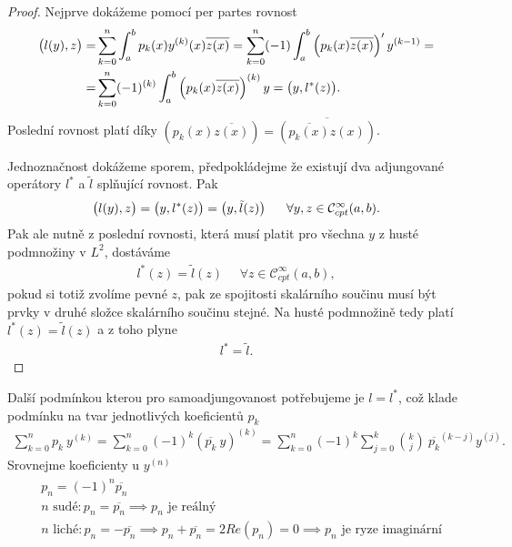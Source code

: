 \begin{proof}
Nejprve dokážeme pomocí per partes rovnost
\begin{align*}
\begin{split}
    \big( l(y), z \big) =& \sum_{k=0}^{n} \int_a^b p_k(x) y^{(k)}(x) \overline{z(x)} =
    \sum_{k=0}^{n} (-1) \int_a^b \left(p_k(x) \overline{z(x)}\right)' y^{(k-1)} = \\
    =& \sum_{k=0}^{n} (-1)^{(k)} \int_a^b \left(p_k(x) \overline{z(x)}\right)^{(k)} y =
    \big( y, l^*(z) \big).
\end{split}
\end{align*}
Poslední rovnost platí díky $\left(p_k(x) \overline{z(x)}\right) = \overline{\left(\overline{p_k(x)} z(x)\right)}$.

Jednoznačnost dokážeme sporem, předpokládejme že existují dva adjungované operátory $l^*$ a $\tilde{l}$ splňující rovnost. Pak
\begin{align*}
    \big( l(y), z \big) = \big( y, l^*(z) \big) = \big( y, \tilde{l}(z) \big) ~ ~ ~ ~ ~ \forall y, z \in \mathcal{C}^{\infty}_{cpt} (a,b).
\end{align*}
Pak ale nutně z poslední rovnosti, která musí platit pro všechna $y$ z husté podmnožiny v $L^2$, dostáváme
\begin{align*}
    l^*(z) = \tilde{l}(z) ~ ~ ~ ~ ~ ~ \forall z \in \mathcal{C}^{\infty}_{cpt} (a,b),
\end{align*}
pokud si totiž zvolíme pevné $z$, pak ze spojitosti skalárního součinu musí být prvky v druhé složce skalárního součinu stejné. Na husté podmnožině tedy platí $l^*(z) = \tilde{l}(z)$ a z toho plyne
\begin{align*}
    l^* = \tilde{l}.
\end{align*}
\end{proof}
Další podmínkou kterou pro samoadjungovanost potřebujeme je $l = l^*$, což klade podmínku na tvar jednotlivých koeficientů $p_k$
\begin{align*}
    \sum_{k=0}^{n} p_k ~ y^{(k)} = \sum_{k=0}^{n} (-1)^{k} \left(\overline{p_k} ~ y\right)^{(k)} = \sum_{k=0}^{n} (-1)^{k} \sum_{j=0}^{k} {k \choose j} ~ \overline{p_k}^{(k-j)} y^{(j)}.
\end{align*}
Srovnejme koeficienty u $y^{(n)}$
\begin{align*}
    \begin{split}
        &p_n = (-1)^{n} \overline{p_n} \\
        &\text{$n$ sudé} : p_n = \overline{p_n} \implies \text{$p_n$ je reálný} \\
        &\text{$n$ liché} : p_n = - \overline{p_n} \implies p_n + \overline{p_n} = 2 Re (p_n) = 0 \implies \text{$p_n$ je ryze imaginární}
    \end{split}
\end{align*}
